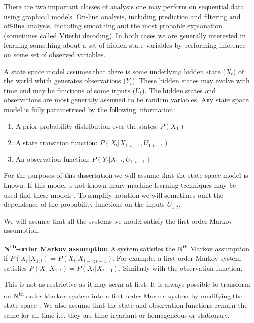 \documentclass[../masters.tex]{subfiles}
\begin{document}
There are two important classes of analysis one may perform on sequential data using graphical models. On-line analysis, including prediction and filtering and off-line analysis, including smoothing and the most probable explanation (sometimes called Viterbi decoding). In both cases we are generally interested in learning something about a set of hidden state variables by performing inference on some set of observed variables. 

A state space model assumes that there is some underlying hidden state ($X_t$) of the world which generates observations ($Y_t$). These hidden states may evolve with time and may be functions of some inputs ($U_t$). The hidden states and observations are most generally assumed to be random variables. Any state space model is fully parametrised by the following information:
\begin{enumerate}
\item
A prior probability distribution over the states: $P(X_1)$
\item
A state transition function: $P(X_t|X_{1:t-1}, U_{1:t-1})$
\item
An observation function: $P(Y_t|X_{1:t}, U_{1:t-1})$
\end{enumerate} 
For the purposes of this dissertation we will assume that the state space model is known. If this model is not known many machine learning techniques may be used find these models \cite{murphy1}. To simplify notation we will sometimes omit the dependence of the probability functions on the inputs $U_{1:t}$.

We will assume that all the systems we model satisfy the first order Markov assumption.
\begin{defn}
\textbf{N\textsuperscript{th}-order Markov assumption} A system satisfies the N\textsuperscript{th} Markov assumption if $P(X_t|X_{1:t})=P(X_t|X_{t-n:t-1})$. For example, a first order Markov system satisfies  $P(X_t|X_{1:t})=P(X_t|X_{t-1})$. Similarly with the observation function.
\end{defn}
This is not as restrictive as it may seem at first. It is always possible to transform an N\textsuperscript{th}-order Markov system into a first order Markov system by modifying the state space \cite{murphy1}. We also assume that the state and observation functions remain the same for all time i.e. they are time invariant or homogeneous or stationary.
\end{document}
